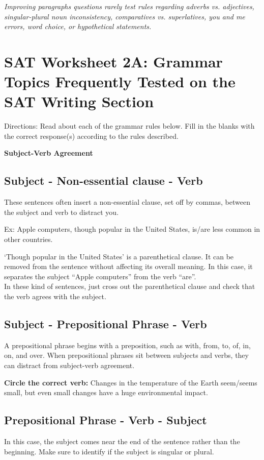 \documentclass[12pt]{book}
\begin{document}
\begin{center}
\bigskip
\textit{Improving paragraphs questions rarely test rules regarding adverbs vs. adjectives, singular-plural noun inconsistency, comparatives vs. superlatives, you and me errors, word choice, or hypothetical statements.}

\end{center}

\bigskip

\bigskip

\section[Grammar Topics]{SAT Worksheet 2A: Grammar Topics Frequently Tested on the SAT Writing Section}
Directions: Read about each of the grammar rules below. Fill in the blanks with the correct response(s) according to the rules described.


\bigskip
\textbf{\large Subject-Verb Agreement}


\subsection{Subject - Non-essential clause - Verb}
These sentences often insert a non-essential clause, set off by commas, between the subject and verb to distract you.

\bigskip
Ex: Apple computers, though popular in the United States, is/are less common in other countries.

\bigskip
‘Though popular in the United States' is a parenthetical clause.  It can be removed from the sentence without affecting its overall meaning.  In this case, it separates the subject “Apple computers” from the verb “are”.\\
In these kind of sentences, just cross out the parenthetical clause and check that the verb agrees with the subject.

\subsection{Subject - Prepositional Phrase - Verb}
A prepositional phrase begins with a preposition, such as with, from, to, of, in, on, and over.  When prepositional phrases sit between subjects and verbs, they can distract from subject-verb agreement.

\bigskip
\textbf{Circle the correct verb:} 
Changes in the temperature of the Earth seem/seems small, but even small changes have a huge environmental impact.


\subsection{Prepositional Phrase - Verb - Subject}
In this case, the subject comes near the end of the sentence rather than the beginning. Make sure to identify if the subject is singular or plural.
\end{document}
